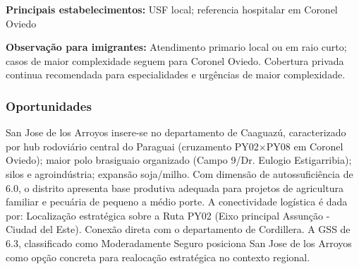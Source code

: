\textbf{Principais estabelecimentos:} USF local; referencia hospitalar
em Coronel Oviedo

\textbf{Observação para imigrantes:} Atendimento primario local ou em
raio curto; casos de maior complexidade seguem para Coronel Oviedo.
Cobertura privada continua recomendada para especialidades e urgências
de maior complexidade.
\newpage

\subsubsection*{Oportunidades}\label{oport-san-jose-de-los-arroyos-0510}
San Jose de los Arroyos insere-se no departamento de Caaguazú, caracterizado por hub rodoviário central do Paraguai (cruzamento PY02×PY08 em Coronel Oviedo); maior polo brasiguaio organizado (Campo 9/Dr. Eulogio Estigarribia); silos e agroindústria; expansão soja/milho. Com dimensão de autossuficiência de 6.0, o distrito apresenta base produtiva adequada para projetos de agricultura familiar e pecuária de pequeno a médio porte. A conectividade logística é dada por: Localização estratégica sobre a Ruta PY02 (Eixo principal Assunção - Ciudad del Este). Conexão direta com o departamento de Cordillera. A GSS de 6.3, classificado como Moderadamente Seguro posiciona San Jose de los Arroyos como opção concreta para realocação estratégica no contexto regional.


